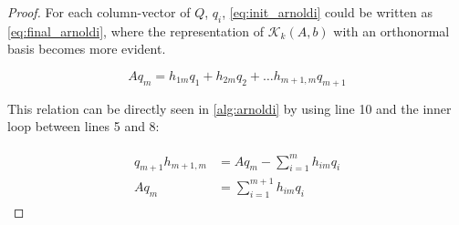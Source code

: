 \begin{proof}
    For each column-vector of $Q$, $q_{i}$, \ref{eq:init_arnoldi} could be written as \ref{eq:final_arnoldi}, where the representation of $\mathcal{K}_{k}(A,b)$ with an orthonormal basis becomes more evident.

    \begin{equation}\label{eq:final_arnoldi}
        Aq_{m} = h_{1m}q_{1} + h_{2m}q_{2} + \dots h_{m+1,m}q_{m+1}
    \end{equation}

    This relation can be directly seen in \ref{alg:arnoldi} by using line 10 and the inner loop between lines 5 and 8:

    \begin{align}
        \begin{split}
            q_{m+1}h_{m+1,m} & = Aq_{m} - \sum_{i=1}^{m} h_{im}q_{i}\\
            Aq_{m} & = \sum_{i=1}^{m+1} h_{im}q_{i}
        \end{split}
    \end{align}

\end{proof}


